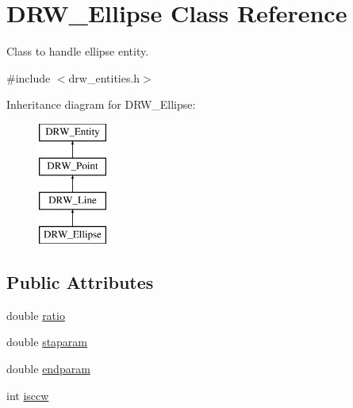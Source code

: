 \hypertarget{class_d_r_w___ellipse}{}\section{D\+R\+W\+\_\+\+Ellipse Class Reference}
\label{class_d_r_w___ellipse}


Class to handle ellipse entity.  




{\ttfamily \#include $<$drw\+\_\+entities.\+h$>$}

Inheritance diagram for D\+R\+W\+\_\+\+Ellipse\+:\begin{figure}[H]
\begin{center}
\leavevmode
\includegraphics[height=4.000000cm]{d0/ded/class_d_r_w___ellipse}
\end{center}
\end{figure}
\subsection*{Public Attributes}
\begin{DoxyCompactItemize}
\item 
double \hyperlink{class_d_r_w___ellipse_a5f99577d5e97fa8e0d308a2ab52a2f95}{ratio}
\item 
double \hyperlink{class_d_r_w___ellipse_a8b9ca88b1d30755bdaa2de0e11116ede}{staparam}
\item 
double \hyperlink{class_d_r_w___ellipse_a69490d7e26d7c8fa602ef4a540b22d52}{endparam}
\item 
int \hyperlink{class_d_r_w___ellipse_a6a8cd9de5c300fde3c52c26daf66ac77}{isccw}
\end{DoxyCompactItemize}
